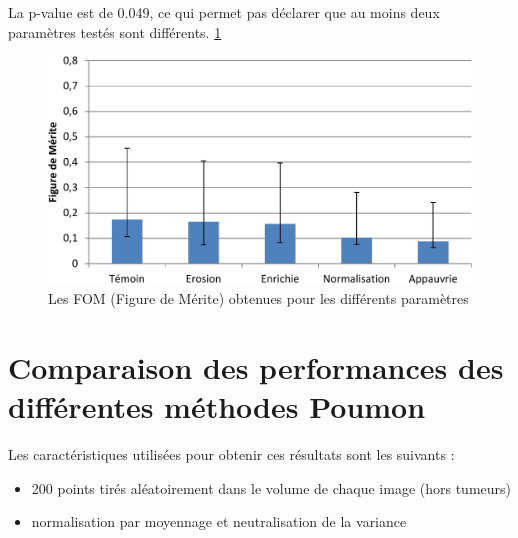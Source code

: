 La p-value est de 0.049, ce qui permet pas déclarer que au moins deux paramètres testés sont différents. \ref{lab:fom_param}


\begin{figure}[h!]
 \begin{center}
   \includegraphics[width=15cm]{images/FOM_param}
 \end{center}
 \caption{ \label{lab:fom_param} Les FOM (Figure de Mérite) obtenues pour les différents paramètres}
\end{figure}

\FloatBarrier

\section{Comparaison des performances des différentes méthodes Poumon}

Les caractéristiques utilisées pour obtenir ces résultats sont les suivants :

\begin{itemize}
 \item 200 points tirés aléatoirement dans le volume de chaque image (hors tumeurs)
 \item normalisation par moyennage et neutralisation de la variance 
\end{itemize}


